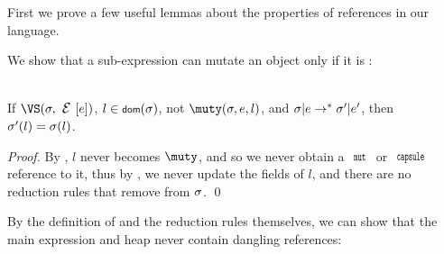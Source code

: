 
	First we prove a few useful lemmas about the properties of references in our language.

	\LS

	\noindent We show that a sub-expression can mutate an object only if it is \muty:
	
\SS\begin{Lemma}\ \\
		\indent If $\VS(\s,\E[e])$, $l \in \dom(\s)$, not $\muty(\s, e, l)$, and $\sigma|e \rightarrow^* \sigma'|e'$, then $\sigma'(l) = \sigma(l)$.
	\end{Lemma}
	\SS\begin{proof}
	By , $l$ never becomes $\muty$, and so we never obtain a $\Kw{mut}$ or $\Kw{capsule}$ reference to it, thus by , we never update the fields of $l$, and there are no reduction rules that remove from $\sigma$.
	\qed\end{proof}


	\LS
	By the definition of \VS and the reduction rules themselves, we can show that the main expression and heap never contain dangling references:
	
